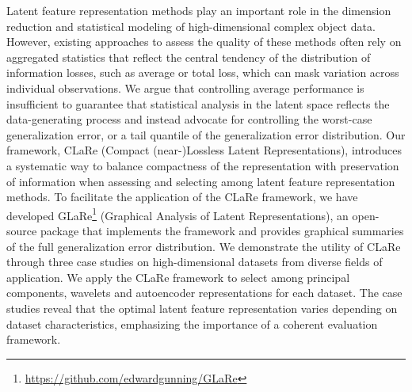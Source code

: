 

Latent feature representation methods play an important role in the dimension reduction and statistical modeling of high-dimensional complex object data.
However, existing approaches to assess the quality of these methods often rely on aggregated statistics that reflect the central tendency of the distribution of information losses, such as average or total loss, which can mask variation across individual observations.
We argue that controlling average performance is insufficient to guarantee that statistical analysis in the latent space reflects the data-generating process and instead advocate for controlling the worst-case generalization error, or a tail quantile of the generalization error distribution.
Our framework, CLaRe (Compact (near-)Lossless Latent Representations), introduces a systematic way to balance compactness of the representation with preservation of information when assessing and selecting among latent feature representation methods. 
To facilitate the application of the CLaRe framework, we have developed GLaRe\footnote{\url{https://github.com/edwardgunning/GLaRe}} (Graphical Analysis of Latent Representations), an open-source  package that implements the framework and provides graphical summaries of the full generalization error distribution.
We demonstrate the utility of CLaRe through three case studies on high-dimensional datasets from diverse fields of application.
We apply the CLaRe framework to select among principal components, wavelets and autoencoder representations for each dataset.
The case studies reveal that the optimal latent feature representation varies depending on dataset characteristics, emphasizing the importance of a coherent evaluation framework.


